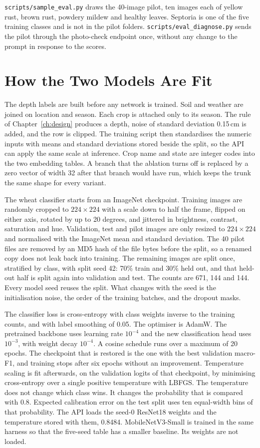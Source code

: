 \texttt{scripts/sample\_eval.py} draws the 40-image pilot, ten images each of yellow rust, brown rust, powdery mildew and healthy leaves. Septoria is one of the five training classes and is not in the pilot folders. \texttt{scripts/eval\_diagnose.py} sends the pilot through the photo-check endpoint once, without any change to the prompt in response to the scores.

\section{How the Two Models Are Fit}
The depth labels are built before any network is trained. Soil and weather are joined on location and season. Each crop is attached only to its season. The rule of Chapter~\ref{ch:design} produces a depth, noise of standard deviation 0.15\,cm is added, and the row is clipped. The training script then standardises the numeric inputs with means and standard deviations stored beside the split, so the API can apply the same scale at inference. Crop name and state are integer codes into the two embedding tables. A branch that the ablation turns off is replaced by a zero vector of width 32 after that branch would have run, which keeps the trunk the same shape for every variant.

The wheat classifier starts from an ImageNet checkpoint. Training images are randomly cropped to $224 \times 224$ with a scale down to half the frame, flipped on either axis, rotated by up to 20 degrees, and jittered in brightness, contrast, saturation and hue. Validation, test and pilot images are only resized to $224 \times 224$ and normalised with the ImageNet mean and standard deviation. The 40 pilot files are removed by an MD5 hash of the file bytes before the split, so a renamed copy does not leak back into training. The remaining images are split once, stratified by class, with split seed 42: 70\% train and 30\% held out, and that held-out half is split again into validation and test. The counts are 671, 144 and 144. Every model seed reuses the split. What changes with the seed is the initialisation noise, the order of the training batches, and the dropout masks.

The classifier loss is cross-entropy with class weights inverse to the training counts, and with label smoothing of 0.05. The optimiser is AdamW. The pretrained backbone uses learning rate $10^{-4}$ and the new classification head uses $10^{-3}$, with weight decay $10^{-4}$. A cosine schedule runs over a maximum of 20 epochs. The checkpoint that is restored is the one with the best validation macro-F1, and training stops after six epochs without an improvement. Temperature scaling is fit afterwards, on the validation logits of that checkpoint, by minimising cross-entropy over a single positive temperature with LBFGS. The temperature does not change which class wins. It changes the probability that is compared with 0.8. Expected calibration error on the test split uses ten equal-width bins of that probability. The API loads the seed-0 ResNet18 weights and the temperature stored with them, 0.8484. MobileNetV3-Small is trained in the same harness so that the five-seed table has a smaller baseline. Its weights are not loaded.

